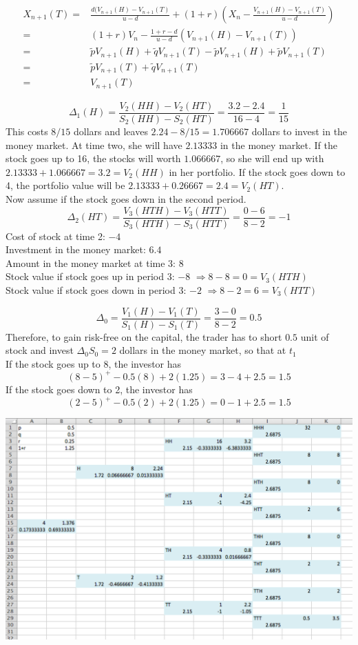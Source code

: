 \documentclass[12pt]{article}
\newenvironment{problem}[2][Problem]{\begin{trivlist}
		\item[\hskip \labelsep {\bfseries #1}\hskip \labelsep {\bfseries #2.}]}{\end{trivlist}}
\begin{document}
	\begin{align*}X_{n+1}(T) =& \frac{d(V_{n+1}(H)-V_{n+1}(T)}{u-d} +(1+r)\left(X_n-\frac{V_{n+1}(H)-V_{n+1}(T)}{u-d}\right)\\
	=&(1+r)V_n - \frac{1+r-d}{u-d}(V_{n+1}(H)-V_{n+1}(T))\\
	=&\tilde{p}V_{n+1}(H)+\tilde{q}V_{n+1}(T)-\tilde{p}V_{n+1}(H)+\tilde{p}V_{n+1}(T)\\
	=&\tilde{p}V_{n+1}(T)+\tilde{q}V_{n+1}(T)\\
	=&V_{n+1}(T)
	\end{align*}
	\begin{problem}{5}\end{problem}
	$$\Delta_1(H)=\frac{V_2(HH)-V_2(HT)}{S_2(HH)-S_2(HT)}=\frac{3.2-2.4}{16-4}=\frac{1}{15}$$
	This costs $8/15$ dollars and leaves $2.24-8/15 = 1.706667$ dollars to invest in the money market. At time two, she will have $2.13333$ in the money market. If the stock goes up to 16, the stocks will worth $1.066667$, so she will end up with $2.13333+1.066667 = 3.2 = V_2(HH)$ in her portfolio. If the stock goes down to 4, the portfolio value will be $2.13333+0.26667 = 2.4 = V_2(HT)$.\\
	Now assume if the stock goes down in the second period.
	$$\Delta_2(HT) = \frac{V_3(HTH) - V_3(HTT)}{S_3(HTH) -S_3(HTT)} = \frac{0-6}{8-2}=-1$$
	Cost of stock at time 2: $-4$\\
	Investment in the money market: $6.4$\\
	Amount in the money market at time 3: $8$\\
	Stock value if stock goes up in period 3: $-8$ $\Rightarrow  8-8 = 0=V_3(HTH)$\\
	Stock value if stock goes down in period 3: $-2$ $\Rightarrow  8-2 = 6=V_3(HTT) $\\
	\begin{problem}{6}\end{problem}
	$$\Delta_0 = \frac{V_1(H)-V_1(T)}{S_1(H) - S_1(T)}=\frac{3-0}{8-2} = 0.5$$
	Therefore, to gain risk-free on the capital, the trader has to short $0.5$ unit of stock and invest $\Delta_0S_0 = 2$ dollars in the money market, so that at $t_1$\\
	If the stock goes up to 8, the investor has
	$$(8-5)^+-0.5(8)+2(1.25) = 3-4+2.5 = 1.5$$
	If the stock goes down to 2, the investor has
	$$(2-5)^+-0.5(2)+2(1.25) = 0-1+2.5 = 1.5$$
	\begin{problem}{7}\end{problem}
	\includegraphics[scale=0.6]{Ex1_7.png}
\end{document}
